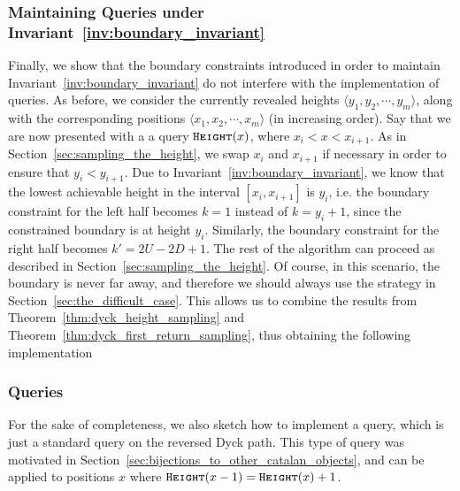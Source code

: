 \subsubsection{Maintaining  Queries under Invariant~\ref{inv:boundary_invariant}}
\label{sec:maintaining_height_queries_under_invariant}
Finally, we show that the boundary constraints introduced in order to maintain Invariant~\ref{inv:boundary_invariant}
do not interfere with the implementation of  queries.
As before, we consider the currently revealed heights $ \langle y_1, y_2,\cdots, y_m \rangle$,
along with the corresponding positions $ \langle x_1, x_2,\cdots, x_m \rangle$ (in increasing order).
Say that we are now presented with a a query $\texttt{\textsc{Height}}(x)$, where $x_i < x < x_{i+1}$.
As in Section~\ref{sec:sampling_the_height}, we swap $x_i$ and $x_{i+1}$ if necessary in order to ensure that $y_i < y_{i+1}$.
Due to Invariant~\ref{inv:boundary_invariant}, we know that the lowest achievable height in the interval $[x_i, x_{i+1}]$ is $y_i$,
i.e. the boundary constraint for the left half becomes $k = 1$ instead of $k = y_i + 1$, since the constrained boundary is at height $y_i$.
Similarly, the boundary constraint for the right half becomes $k' = 2U - 2D + 1$.
The rest of the algorithm can proceed as described in Section~\ref{sec:sampling_the_height}.
Of course, in this scenario, the boundary is never far away, and therefore we should always use the strategy in Section~\ref{sec:the_difficult_case}.
This allows us to combine the results from Theorem~\ref{thm:dyck_height_sampling} and Theorem~\ref{thm:dyck_first_return_sampling},
thus obtaining the following implementation
\CatalanGrand*


\subsubsection{ Queries}
\label{sec:reverse_first_return_queries}
For the sake of completeness, we also sketch how to implement a  query,
which is just a standard  query on the reversed Dyck path.
This type of query was motivated in Section~\ref{sec:bijections_to_other_catalan_objects},
and can be applied to positions $x$ where $\texttt{\textsc{Height}}(x-1) = \texttt{\textsc{Height}}(x)+1$.

